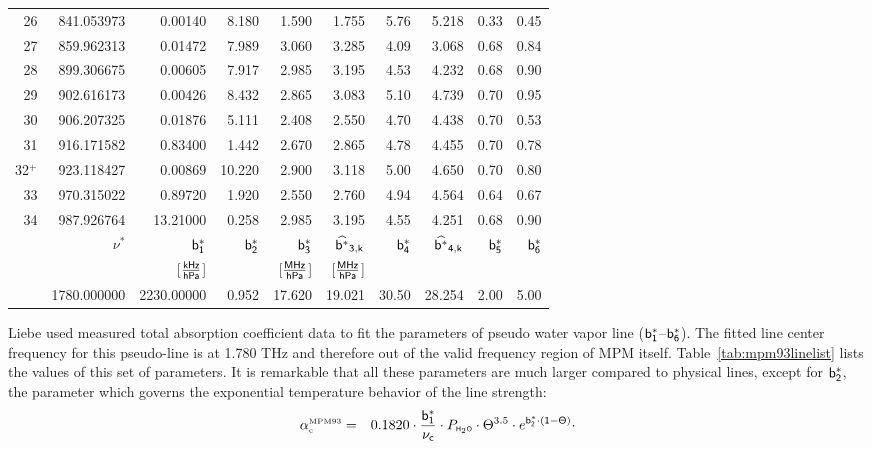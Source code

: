 {\begin{longtable}{rrrrrrrrrr}
26     & 841.053973 & 0.00140 & 8.180 & 1.590 & 1.755 & 5.76 & 5.218 & 0.33 & 0.45 \\
27     & 859.962313 & 0.01472 & 7.989 & 3.060 & 3.285 & 4.09 & 3.068 & 0.68 & 0.84 \\
28     & 899.306675 & 0.00605 & 7.917 & 2.985 & 3.195 & 4.53 & 4.232 & 0.68 & 0.90 \\
29     & 902.616173 & 0.00426 & 8.432 & 2.865 & 3.083 & 5.10 & 4.739 & 0.70 & 0.95 \\
30     & 906.207325 & 0.01876 & 5.111 & 2.408 & 2.550 & 4.70 & 4.438 & 0.70 & 0.53 \\
31     & 916.171582 & 0.83400 & 1.442 & 2.670 & 2.865 & 4.78 & 4.455 & 0.70 & 0.78 \\
32$^+$ & 923.118427 & 0.00869 & 10.220& 2.900 & 3.118 & 5.00 & 4.650 & 0.70 & 0.80 \\
33     & 970.315022 & 0.89720 & 1.920 & 2.550 & 2.760 & 4.94 & 4.564 & 0.64 & 0.67 \\
34     & 987.926764 & 13.21000& 0.258 & 2.985 & 3.195 & 4.55 & 4.251 & 0.68 & 0.90 \\
\hline
 & $\nu^*$ & $\sf b^*_{\sf 1}$ & $\sf b^*_{\sf 2}$ & $\sf b^*_{\sf 3}$ & $\sf \widehat{b^*}_{\sf 3,k}$ & $\sf b^*_{\sf 4}$ &
 $\sf \widehat{b^*}_{\sf 4,k}$ & $\sf b^*_{\sf 5}$ & $\sf b^*_{\sf 6}$\\
 & {\sf [GHz]}  & {[$\frac{\sf kHz}{\sf hPa}$]} & {\sf [1]} & 
 {[$\frac{\sf MHz}{\sf hPa}$]} & {[$\frac{\sf MHz}{\sf hPa}$]} & 
 {\sf [1]} & {\sf [1]} & {\sf [1]} & {\sf [1]} \\
\hline
 & 1780.000000 & 2230.00000 & 0.952 & 17.620 & 19.021 & 30.50 & 28.254 & 2.00 & 5.00 \\
\end{longtable}
%
%
\label{levele:mpm93:contabs}
Liebe used measured total absorption coefficient data to fit the 
parameters of pseudo water vapor line ($\sf b^*_{\sf 1}$--$\sf b^*_{\sf 6}$). 
The fitted line center frequency for this pseudo-line is at 
1.780 THz and therefore out of the valid frequency region of MPM 
itself. Table~\ref{tab:mpm93linelist} lists the values of this set 
of parameters. It is remarkable that all these parameters are much 
larger compared to physical lines, except for $\sf b^*_{\sf 2}$, the parameter 
which governs the exponential temperature behavior of the line strength:
\begin{eqnarray}
  \label{eq:mpm93:contabs}
  \alphampmnc & = & 0.1820 \cdot \frac{\beks}{\nucc} \cdot \phzo \cdot 
                \Theta^{3.5} \cdot e^{\bzks\cdot(1-\Theta)} \cdot 

\end{eqnarray}}
